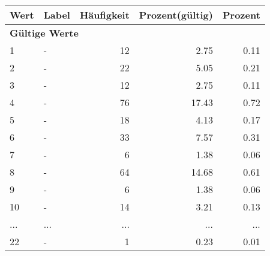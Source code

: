      \begin{longtable}{lXrrr}
     \toprule
     \textbf{Wert} & \textbf{Label} & \textbf{Häufigkeit} & \textbf{Prozent(gültig)} & \textbf{Prozent} \\
     \endhead
     \midrule
     \multicolumn{5}{l}{\textbf{Gültige Werte}}\\
        1 & \multicolumn{1}{X}{-} & %
          \num{12} &
          \num[round-mode=places,round-precision=2]{2.75} &
          \num[round-mode=places,round-precision=2]{0.11} \\
        2 & \multicolumn{1}{X}{-} & %
          \num{22} &
          \num[round-mode=places,round-precision=2]{5.05} &
          \num[round-mode=places,round-precision=2]{0.21} \\
        3 & \multicolumn{1}{X}{-} & %
          \num{12} &
          \num[round-mode=places,round-precision=2]{2.75} &
          \num[round-mode=places,round-precision=2]{0.11} \\
        4 & \multicolumn{1}{X}{-} & %
          \num{76} &
          \num[round-mode=places,round-precision=2]{17.43} &
          \num[round-mode=places,round-precision=2]{0.72} \\
        5 & \multicolumn{1}{X}{-} & %
          \num{18} &
          \num[round-mode=places,round-precision=2]{4.13} &
          \num[round-mode=places,round-precision=2]{0.17} \\
        6 & \multicolumn{1}{X}{-} & %
          \num{33} &
          \num[round-mode=places,round-precision=2]{7.57} &
          \num[round-mode=places,round-precision=2]{0.31} \\
        7 & \multicolumn{1}{X}{-} & %
          \num{6} &
          \num[round-mode=places,round-precision=2]{1.38} &
          \num[round-mode=places,round-precision=2]{0.06} \\
        8 & \multicolumn{1}{X}{-} & %
          \num{64} &
          \num[round-mode=places,round-precision=2]{14.68} &
          \num[round-mode=places,round-precision=2]{0.61} \\
        9 & \multicolumn{1}{X}{-} & %
          \num{6} &
          \num[round-mode=places,round-precision=2]{1.38} &
          \num[round-mode=places,round-precision=2]{0.06} \\
        10 & \multicolumn{1}{X}{-} & %
          \num{14} &
          \num[round-mode=places,round-precision=2]{3.21} &
          \num[round-mode=places,round-precision=2]{0.13} \\
       ... & ... & ... & ... & ... \\
        22 & \multicolumn{1}{X}{-} & %
          \num{1} &
          \num[round-mode=places,round-precision=2]{0.23} &
          \num[round-mode=places,round-precision=2]{0.01} \\


\end{longtable}
